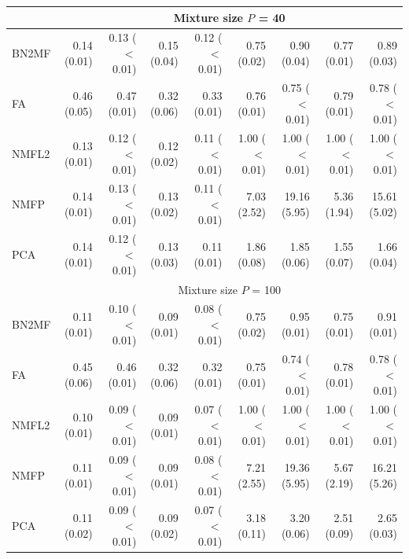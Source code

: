 \begin{landscape}
\begin{table}[!htbp]
\begin{tabular}{lrr|rr|rr|rr}
\hline 
& \multicolumn{8}{c}{Mixture size $P$ = 40} \\
\hline 
BN2MF & 0.14 (0.01) & 0.13 ($<$0.01) & 0.15 (0.04) & 0.12 ($<$0.01) & 0.75 (0.02) & 0.90 (0.04) & 0.77 (0.01) & 0.89 (0.03) \\ 
FA & 0.46 (0.05) & 0.47 (0.01) & 0.32 (0.06) & 0.33 (0.01) & 0.76 (0.01) & 0.75 ($<$0.01) & 0.79 (0.01) & 0.78 ($<$0.01) \\ 
NMFL2 & 0.13 (0.01) & 0.12 ($<$0.01) & 0.12 (0.02) & 0.11 ($<$0.01) & 1.00 ($<$0.01) & 1.00 ($<$0.01) & 1.00 ($<$0.01) & 1.00 ($<$0.01) \\ 
NMFP & 0.14 (0.01) & 0.13 ($<$0.01) & 0.13 (0.02) & 0.11 ($<$0.01) & 7.03 (2.52) & 19.16 (5.95) & 5.36 (1.94) & 15.61 (5.02) \\ 
PCA & 0.14 (0.01) & 0.12 ($<$0.01) & 0.13 (0.03) & 0.11 (0.01) & 1.86 (0.08) & 1.85 (0.06) & 1.55 (0.07) & 1.66 (0.04) \\ 
\hline 
& \multicolumn{8}{c}{Mixture size $P$ = 100} \\
\hline 
BN2MF & 0.11 (0.01) & 0.10 ($<$0.01) & 0.09 (0.01) & 0.08 ($<$0.01) & 0.75 (0.02) & 0.95 (0.01) & 0.75 (0.01) & 0.91 (0.01) \\ 
FA & 0.45 (0.06) & 0.46 (0.01) & 0.32 (0.06) & 0.32 (0.01) & 0.75 (0.01) & 0.74 ($<$0.01) & 0.78 (0.01) & 0.78 ($<$0.01) \\ 
NMFL2 & 0.10 (0.01) & 0.09 ($<$0.01) & 0.09 (0.01) & 0.07 ($<$0.01) & 1.00 ($<$0.01) & 1.00 ($<$0.01) & 1.00 ($<$0.01) & 1.00 ($<$0.01) \\ 
NMFP & 0.11 (0.01) & 0.09 ($<$0.01) & 0.09 (0.01) & 0.08 ($<$0.01) & 7.21 (2.55) & 19.36 (5.95) & 5.67 (2.19) & 16.21 (5.26) \\ 
PCA & 0.11 (0.02) & 0.09 ($<$0.01) & 0.09 (0.02) & 0.07 ($<$0.01) & 3.18 (0.11) & 3.20 (0.06) & 2.51 (0.09) & 2.65 (0.03) \\ 
\hline
\hline  
\end{tabular}
\end{table}
\endgroup
\end{landscape}

